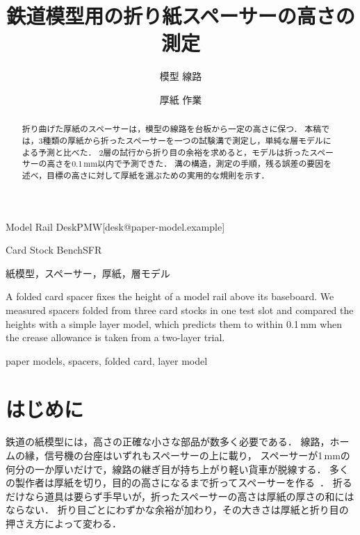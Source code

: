 \documentclass[submit]{ipsj}
\begin{document}
\title{鉄道模型用の折り紙スペーサーの高さの測定}




\author{模型 線路}{Model Rail Desk}{PMW}[desk@paper-model.example]
\author{厚紙 作業}{Card Stock Bench}{SFR}

\begin{abstract}
折り曲げた厚紙のスペーサーは，模型の線路を台板から一定の高さに保つ．
本稿では，3種類の厚紙から折ったスペーサーを一つの試験溝で測定し，単純な層モデルによる予測と比べた．
2層の試行から折り目の余裕を求めると，モデルは折ったスペーサーの高さを0.1\,mm以内で予測できた．
溝の構造，測定の手順，残る誤差の要因を述べ，目標の高さに対して厚紙を選ぶための実用的な規則を示す．
\end{abstract}

\begin{jkeyword}
紙模型，スペーサー，厚紙，層モデル
\end{jkeyword}

\begin{eabstract}
A folded card spacer fixes the height of a model rail above its baseboard.
We measured spacers folded from three card stocks in one test slot and compared
the heights with a simple layer model, which predicts them to within 0.1\,mm when
the crease allowance is taken from a two-layer trial.
\end{eabstract}

\begin{ekeyword}
paper models, spacers, folded card, layer model
\end{ekeyword}

\maketitle

\section{はじめに}\label{sec:intro}
鉄道の紙模型には，高さの正確な小さな部品が数多く必要である．
線路，ホームの縁，信号機の台座はいずれもスペーサーの上に載り，
スペーサーが1\,mmの何分の一か厚いだけで，線路の継ぎ目が持ち上がり軽い貨車が脱線する．
多くの製作者は厚紙を切り，目的の高さになるまで折ってスペーサーを作る~\cite{desk25}．
折るだけなら道具は要らず手早いが，折ったスペーサーの高さは厚紙の厚さの和にはならない．
折り目ごとにわずかな余裕が加わり，その大きさは厚紙と折り目の押さえ方によって変わる．
\end{document}
